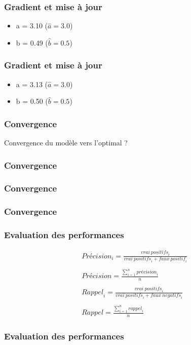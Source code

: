 \documentclass{formation}
\begin{document}
\begin{frame}
  \frametitle{Gradient et mise à jour}
  \begin{itemize}
  \item a = 3.10 ($\hat{a} = 3.0$)
  \item b = 0.49 ($\hat{b} = 0.5$)
  \end{itemize}
\end{frame}

\begin{frame}
  \frametitle{Gradient et mise à jour}
  \begin{itemize}
  \item a = 3.13 ($\hat{a} = 3.0$)
  \item b = 0.50 ($\hat{b} = 0.5$)
  \end{itemize}
\end{frame}

\begin{frame}
  \frametitle{Convergence}
  Convergence du modèle vers l'optimal ?
\end{frame}

\begin{frame}
  \frametitle{Convergence}
\end{frame}

\begin{frame}
  \frametitle{Convergence}
\end{frame}

\begin{frame}
  \frametitle{Convergence}
\end{frame}

\begin{frame}
  \frametitle{Evaluation des performances}
  \begin{align*}
    &\mathit{Précision}_i = \frac{\mathit{vrai\:positifs}_i}{\mathit{vrai\:positifs}_i+\mathit{faux\:positif}_i} \\
    &\\
    &\mathit{Précision} = \frac{\sum\limits_{i=1}^n \mathit{précision}_i}{n} \\
    &\\
    &\mathit{Rappel}_i = \frac{\mathit{vrai\:positifs}_i}{\mathit{vrai\:positifs}_i+\mathit{faux\:negatifs}_i} \\
    &\\
    &\mathit{Rappel} = \frac{\sum\limits_{i=1}^n \mathit{rappel}_i}{n}
  \end{align*}
\end{frame}

\begin{frame}
  \frametitle{Evaluation des performances}
\end{frame}
\end{document}
